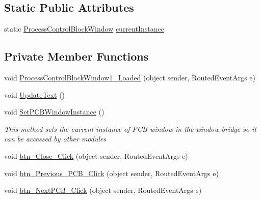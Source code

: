 \subsection*{Static Public Attributes}
\begin{DoxyCompactItemize}
\item 
static \hyperlink{class_c_p_u___o_s___simulator_1_1_process_control_block_window}{Process\+Control\+Block\+Window} \hyperlink{class_c_p_u___o_s___simulator_1_1_process_control_block_window_a88bea947f074426da083add43be70d48}{current\+Instance}
\end{DoxyCompactItemize}
\subsection*{Private Member Functions}
\begin{DoxyCompactItemize}
\item 
void \hyperlink{class_c_p_u___o_s___simulator_1_1_process_control_block_window_a18ccb30540f400cf07a224304c882c32}{Process\+Control\+Block\+Window1\+\_\+\+Loaded} (object sender, Routed\+Event\+Args e)
\item 
void \hyperlink{class_c_p_u___o_s___simulator_1_1_process_control_block_window_a9bb10e14d5a7e732ce6e5e5e0f66b678}{Update\+Text} ()
\item 
void \hyperlink{class_c_p_u___o_s___simulator_1_1_process_control_block_window_aa2c224432467974c6cf46c83a01735fa}{Set\+P\+C\+B\+Window\+Instance} ()
\begin{DoxyCompactList}\small\item\em This method sets the current instance of P\+C\+B window in the window bridge so it can be accessed by other modules \end{DoxyCompactList}\item 
void \hyperlink{class_c_p_u___o_s___simulator_1_1_process_control_block_window_a3b65012264c411aa3524bfb9b1e6bfe5}{btn\+\_\+\+Close\+\_\+\+Click} (object sender, Routed\+Event\+Args e)
\item 
void \hyperlink{class_c_p_u___o_s___simulator_1_1_process_control_block_window_a071ef7272a71ad3a0004c70bbcc4ad0a}{btn\+\_\+\+Previous\+\_\+\+P\+C\+B\+\_\+\+Click} (object sender, Routed\+Event\+Args e)
\item 
void \hyperlink{class_c_p_u___o_s___simulator_1_1_process_control_block_window_a752d089879e7d6aa80faef5ffc5f68cd}{btn\+\_\+\+Next\+P\+C\+B\+\_\+\+Click} (object sender, Routed\+Event\+Args e)
\end{DoxyCompactItemize}
